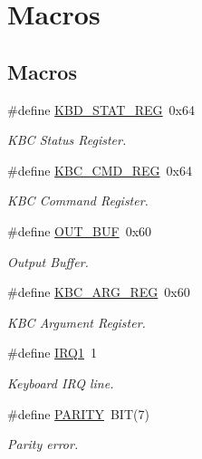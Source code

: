 \hypertarget{group__Keyboard}{}\section{Macros}
\label{group__Keyboard}
\subsection*{Macros}
\begin{DoxyCompactItemize}
\item 
\#define \hyperlink{group__Keyboard_ga815e867a053281889c7af9a8f1f31ba6}{K\+B\+D\+\_\+\+S\+T\+A\+T\+\_\+\+R\+EG}~0x64
\begin{DoxyCompactList}\small\item\em K\+BC Status Register. \end{DoxyCompactList}\item 
\#define \hyperlink{group__Keyboard_ga6d57c7927a10f638c83046b52c8caac9}{K\+B\+C\+\_\+\+C\+M\+D\+\_\+\+R\+EG}~0x64
\begin{DoxyCompactList}\small\item\em K\+BC Command Register. \end{DoxyCompactList}\item 
\#define \hyperlink{group__Keyboard_gacfb42dde389e8ca36ab267002fbf5c6a}{O\+U\+T\+\_\+\+B\+UF}~0x60
\begin{DoxyCompactList}\small\item\em Output Buffer. \end{DoxyCompactList}\item 
\#define \hyperlink{group__Keyboard_gaf4cd2a6365d38e35ff54b89ff2c2526b}{K\+B\+C\+\_\+\+A\+R\+G\+\_\+\+R\+EG}~0x60
\begin{DoxyCompactList}\small\item\em K\+BC Argument Register. \end{DoxyCompactList}\item 
\#define \hyperlink{group__Keyboard_ga37360776bcc1dd3b5da93b025177551f}{I\+R\+Q1}~1
\begin{DoxyCompactList}\small\item\em Keyboard I\+RQ line. \end{DoxyCompactList}\item 
\#define \hyperlink{group__Keyboard_gaf6996d12e71a534569c41a25de7d6d52}{P\+A\+R\+I\+TY}~B\+IT(7)
\begin{DoxyCompactList}\small\item\em Parity error. \end{DoxyCompactList}\item 

\end{DoxyCompactItemize}
